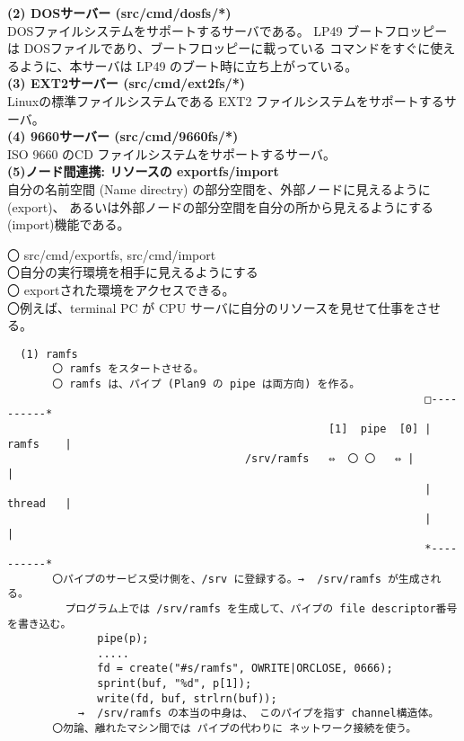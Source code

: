 {{\bf\flushleft  (2) DOSサーバー (src/cmd/dosfs/*)}\\

    DOSファイルシステムをサポートするサーバである。 
LP49 ブートフロッピーは DOSファイルであり、ブートフロッピーに載っている
コマンドをすぐに使えるように、本サーバは LP49 のブート時に立ち上がっている。
  \\

{\bf\flushleft  (3) EXT2サーバー (src/cmd/ext2fs/*)}\\

    Linuxの標準ファイルシステムである EXT2 ファイルシステムをサポートするサーバ。
   \\

{\bf\flushleft  (4) 9660サーバー (src/cmd/9660fs/*)}\\

    ISO 9660 のCD ファイルシステムをサポートするサーバ。
   \\

{\bf\flushleft  (5)ノード間連携: リソースの exportfs/import}\\

      自分の名前空間 (Name directry) の部分空間を、外部ノードに見えるように(export)、
あるいは外部ノードの部分空間を自分の所から見えるようにする(import)機能である。

      〇 src/cmd/exportfs, src/cmd/import\\


     〇自分の実行環境を相手に見えるようにする      \\

     〇 exportされた環境をアクセスできる。  \\

     〇例えば、terminal PC が CPU サーバに自分のリソースを見せて仕事をさせる。

   \vspace{4cm}


    
    
\bf{}

\begin{verbatim}                                                                   
  (1) ramfs     
       〇 ramfs をスタートさせる。
       〇 ramfs は、パイプ (Plan9 の pipe は両方向) を作る。
                                                                 □----------*    
                                                  [1]  pipe  [0] | ramfs    |     
                                     /srv/ramfs   ⇔  〇 〇   ⇔ |          |     
                                                                 | thread   |     
                                                                 |          |     
                                                                 *----------*     
       〇パイプのサービス受け側を、/srv に登録する。→  /srv/ramfs が生成される。
         プログラム上では /srv/ramfs を生成して、パイプの file descriptor番号を書き込む。
              pipe(p);
              .....
              fd = create("#s/ramfs", OWRITE|ORCLOSE, 0666);
              sprint(buf, "%d", p[1]);
              write(fd, buf, strlrn(buf));
           →  /srv/ramfs の本当の中身は、 このパイプを指す channel構造体。
       〇勿論、離れたマシン間では パイプの代わりに ネットワーク接続を使う。


\end{verbatim}}
